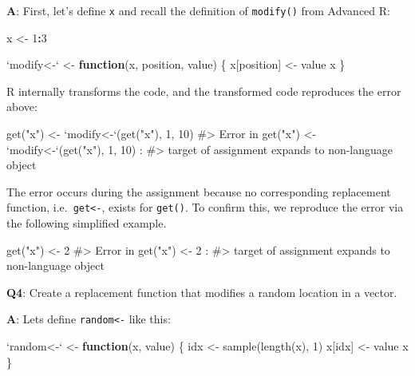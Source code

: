 \documentclass[
]{krantz}
\makeatletter
\newenvironment{Shaded}{\begin{snugshade}}{\end{snugshade}}
\newcommand{\CommentTok}[1]{\textcolor[rgb]{0.56,0.35,0.01}{\textit{#1}}}
\newcommand{\ControlFlowTok}[1]{\textcolor[rgb]{0.13,0.29,0.53}{\textbf{#1}}}
\newcommand{\DataTypeTok}[1]{\textcolor[rgb]{0.13,0.29,0.53}{#1}}
\newcommand{\DecValTok}[1]{\textcolor[rgb]{0.00,0.00,0.81}{#1}}
\newcommand{\KeywordTok}[1]{\textcolor[rgb]{0.13,0.29,0.53}{\textbf{#1}}}
\newcommand{\NormalTok}[1]{#1}
\newcommand{\OperatorTok}[1]{\textcolor[rgb]{0.81,0.36,0.00}{\textbf{#1}}}
\newcommand{\StringTok}[1]{\textcolor[rgb]{0.31,0.60,0.02}{#1}}
\newenvironment{kframe}{%
\medskip{}
\setlength{\fboxsep}{.8em}
 \def\at@end@of@kframe{}%
 \ifinner\ifhmode%
  \def\at@end@of@kframe{\end{minipage}}%
  \begin{minipage}{\columnwidth}%
 \fi\fi%
 \def\FrameCommand##1{\hskip\@totalleftmargin \hskip-\fboxsep
 \colorbox{shadecolor}{##1}\hskip-\fboxsep
     \hskip-\linewidth \hskip-\@totalleftmargin \hskip\columnwidth}%
 \MakeFramed {\advance\hsize-\width
   \@totalleftmargin\z@ \linewidth\hsize
   \@setminipage}}%
 {\par\unskip\endMakeFramed%
 \at@end@of@kframe}
\renewenvironment{Shaded}{\begin{kframe}}{\end{kframe}}
\renewcommand{\KeywordTok} [1]{\textcolor[rgb]{0.00,0.44,0.13}{{#1}}}
\renewcommand{\DataTypeTok}[1]{\textcolor[rgb]{0.56,0.13,0.00}{{#1}}}
\renewcommand{\DecValTok}  [1]{\textcolor[rgb]{0.25,0.63,0.44}{{#1}}}
\renewcommand{\StringTok}  [1]{\textcolor[rgb]{0.25,0.44,0.63}{{#1}}}
\renewcommand{\CommentTok} [1]{\textcolor[rgb]{0.38,0.63,0.69}{{#1}}}
\renewcommand{\NormalTok}  [1]{{#1}}
\makeatother
\begin{document}
\textbf{{A}}: First, let's define \texttt{x} and recall the definition of \texttt{modify()} from Advanced R:

\begin{Shaded}
\begin{Highlighting}[]
\NormalTok{x <-}\StringTok{ }\DecValTok{1}\OperatorTok{:}\DecValTok{3}

\StringTok{`}\DataTypeTok{modify<-}\StringTok{`}\NormalTok{ <-}\StringTok{ }\ControlFlowTok{function}\NormalTok{(x, position, value) \{}
\NormalTok{  x[position] <-}\StringTok{ }\NormalTok{value}
\NormalTok{  x}
\NormalTok{\}}
\end{Highlighting}
\end{Shaded}

R internally transforms the code, and the transformed code reproduces the error above:

\begin{Shaded}
\begin{Highlighting}[]
\KeywordTok{get}\NormalTok{(}\StringTok{"x"}\NormalTok{) <-}\StringTok{ `}\DataTypeTok{modify<-}\StringTok{`}\NormalTok{(}\KeywordTok{get}\NormalTok{(}\StringTok{"x"}\NormalTok{), }\DecValTok{1}\NormalTok{, }\DecValTok{10}\NormalTok{)}
\CommentTok{#> Error in get("x") <- `modify<-`(get("x"), 1, 10) : }
\CommentTok{#>   target of assignment expands to non-language object}
\end{Highlighting}
\end{Shaded}

The error occurs during the assignment because no corresponding replacement function, i.e.~\texttt{get\textless{}-}, exists for \texttt{get()}. To confirm this, we reproduce the error via the following simplified example.

\begin{Shaded}
\begin{Highlighting}[]
\KeywordTok{get}\NormalTok{(}\StringTok{"x"}\NormalTok{) <-}\StringTok{ }\DecValTok{2}
\CommentTok{#> Error in get("x") <- 2 :}
\CommentTok{#>   target of assignment expands to non-language object}
\end{Highlighting}
\end{Shaded}

\textbf{{Q4}}: Create a replacement function that modifies a random location in a vector.

\textbf{{A}}: Lets define \texttt{random\textless{}-} like this:

\begin{Shaded}
\begin{Highlighting}[]
\StringTok{`}\DataTypeTok{random<-}\StringTok{`}\NormalTok{ <-}\StringTok{ }\ControlFlowTok{function}\NormalTok{(x, value) \{}
\NormalTok{  idx <-}\StringTok{ }\KeywordTok{sample}\NormalTok{(}\KeywordTok{length}\NormalTok{(x), }\DecValTok{1}\NormalTok{)}
\NormalTok{  x[idx] <-}\StringTok{ }\NormalTok{value}
\NormalTok{  x}
\NormalTok{\}}
\end{Highlighting}
\end{Shaded}
\end{document}
